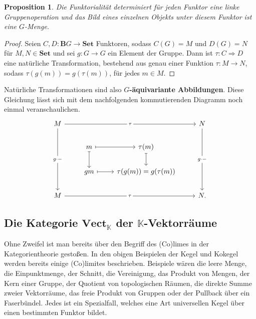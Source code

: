 \documentclass{article}
\theoremstyle{plain}
\newtheorem{prop}[thm]{Proposition}
\theoremstyle{definition}
\theoremstyle{remark}
\begin{document}
\begin{prop}
Die Funktorialität determiniert für jeden Funktor eine linke Gruppenoperation und das Bild eines einzelnen Objekts unter diesem Funktor ist eine $G$-Menge.
\end{prop}

\begin{proof}
Seien $C,D: \textbf{B}G \rightarrow \textbf{Set}$ Funktoren, sodass $C(G) = M$ und $D(G) = N$ für $M,N \in \textbf{Set}$ und sei $g: G \rightarrow G$ ein Element der Gruppe. Dann ist $\tau: C \Longrightarrow D$ eine natürliche Transformation, bestehend aus genau einer Funktion $\tau: M \rightarrow N$, sodass $\tau(g(m)) = g(\tau(m))$, für jedes $m \in M$.
\end{proof}

Natürliche Transformationen sind also \textbf{$G$-äquivariante Abbildungen}. Diese Gleichung lässt sich mit dem nachfolgenden kommutierenden Diagramm noch einmal veranschaulichen.
	\begin{equation}
		\begin{tikzcd}
		M \arrow[rrr, "\tau" description] \arrow[ddd, "g\cdot-" description] &                                         &                            & N \arrow[ddd, "g\cdot-" description] \\
		                                                                     & m \arrow[d, maps to] \arrow[r, maps to] & \tau(m) \arrow[d, maps to] &                                      \\
		                                                                     & gm \arrow[r, maps to]                   & \tau(g(m)) = g(\tau(m))    &                                      \\
		M \arrow[rrr, "\tau" description]                                    &                                         &                            & N.                                   
		\end{tikzcd}
	\end{equation}

\subsection{Die Kategorie $\textbf{Vect}_{\mathbb{K}}$ der $\mathbb{K}$-Vektorräume}
Ohne Zweifel ist man bereits über den Begriff des (Co)limes in der Kategorientheorie gestoßen. In den obigen Beispielen der Kegel und Kokegel werden bereits einige (Co)limites beschrieben. Beispiele wären die leere Menge, die Einpunktmenge, der Schnitt, die Vereinigung, das Produkt von Mengen, der Kern einer Gruppe, der Quotient von topologischen Räumen, die direkte Summe zweier Vektorräume, das freie Produkt von Gruppen oder der Pullback über ein Faserbündel. Jedes ist ein Spezialfall, welches eine Art universellen Kegel über einen bestimmten Funktor bildet.
\end{document}
